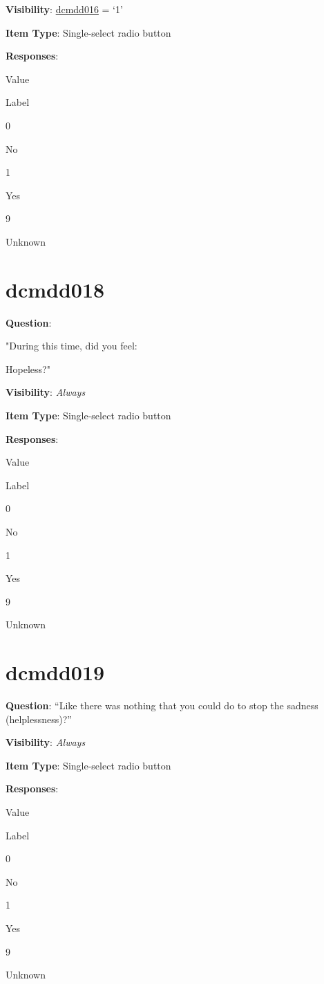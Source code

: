 \documentclass[]{book}
\begin{document}
\textbf{Visibility}: \protect\hyperlink{dcmdd016}{dcmdd016} = `1'

\textbf{Item Type}: Single-select radio button

\textbf{Responses}:

Value

Label

0

No

1

Yes

9

Unknown

\hypertarget{dcmdd018}{%
\section{dcmdd018}\label{dcmdd018}}

\textbf{Question}:

"During this time, did you feel:

Hopeless?"

\textbf{Visibility}: \emph{Always}

\textbf{Item Type}: Single-select radio button

\textbf{Responses}:

Value

Label

0

No

1

Yes

9

Unknown

\hypertarget{dcmdd019}{%
\section{dcmdd019}\label{dcmdd019}}

\textbf{Question}: ``Like there was nothing that you could do to stop the sadness (helplessness)?''

\textbf{Visibility}: \emph{Always}

\textbf{Item Type}: Single-select radio button

\textbf{Responses}:

Value

Label

0

No

1

Yes

9

Unknown
\end{document}
